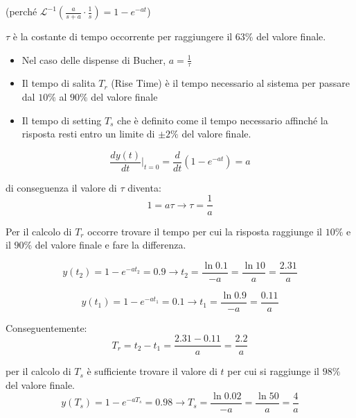 \documentclass[11pt]{article}
\providecommand{\tightlist}{%
      \setlength{\itemsep}{0pt}\setlength{\parskip}{0pt}}
\begin{document}
    (perché
\(\mathcal{L}^{-1}(\frac{a}{s+a} \cdot \frac{1}{s}) = 1 - e^{-at}\))

    \(\tau\) è la costante di tempo occorrente per raggiungere il 63\% del
valore finale.

\begin{itemize}
\tightlist
\item
  Nel caso delle dispense di Bucher, \(a = \frac{1}{\tau}\)
\item
  Il tempo di salita \(T_r\) (Rise Time) è il tempo necessario al
  sistema per passare dal \(10\%\) al \(90\%\) del valore finale
\item
  Il tempo di setting \(T_s\) che è definito come il tempo necessario
  affinché la risposta resti entro un limite di \(\pm 2\%\) del valore
  finale.
\end{itemize}

    \begin{equation}
\frac{dy(t)}{dt} \Big\rvert_{t=0} = \frac{d}{dt} (1-e^{-at}) = a
\end{equation}

di conseguenza il valore di \(\tau\) diventa: \begin{equation}
1 = a \tau \rightarrow \tau = \frac{1}{a}
\end{equation}

    Per il calcolo di \(T_r\) occorre trovare il tempo per cui la risposta
raggiunge il \(10\%\) e il \(90\%\) del valore finale e fare la
differenza.

\begin{equation}
y(t_2) = 1 - e^{-at_2} = 0.9 \rightarrow t_2 = \frac{\ln 0.1}{-a} = \frac{\ln 10}{a} = \frac{2.31}{a}
\end{equation}

\begin{equation}
y(t_1) = 1 - e^{-at_1} = 0.1 \rightarrow t_1 = \frac{\ln 0.9}{-a} = \frac{0.11}{a}
\end{equation}

    Conseguentemente: \begin{equation}
    T_r = t_2 - t_1 = \frac{2.31 - 0.11}{a} = \frac{2.2}{a}
\end{equation}

    per il calcolo di \(T_s\) è sufficiente trovare il valore di \(t\) per
cui si raggiunge il \(98\%\) del valore finale. \begin{equation}
    y(T_s) = 1 - e^{-aT_s} = 0.98 \rightarrow T_s = \frac{\ln 0.02}{-a} = \frac{\ln 50}{a} = \frac{4}{a}
\end{equation}
\end{document}
